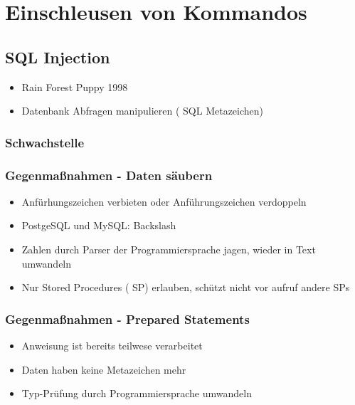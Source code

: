\section*{Einschleusen von Kommandos}
\subsection*{ SQL Injection}
\begin{itemize}
	\item Rain Forest Puppy 1998
	\item Datenbank Abfragen manipulieren ( SQL Metazeichen)
\end{itemize}
\subsubsection*{Schwachstelle }


\subsubsection*{ Gegenmaßnahmen - Daten säubern }
\begin{itemize}
	\item Anfürhungszeichen verbieten oder Anführungszeichen verdoppeln
	\item PostgeSQL und MySQL: Backslash \
	\item Zahlen durch Parser der Programmiersprache jagen, wieder in Text umwandeln
	\item Nur Stored Procedures ( SP) erlauben, schützt nicht vor aufruf andere SPs
\end{itemize}

\subsubsection*{Gegenmaßnahmen - Prepared Statements }
\begin{itemize}
	\item  Anweisung ist bereits teilwese verarbeitet
	\item Daten haben keine Metazeichen mehr
	\item Typ-Prüfung durch Programmiersprache umwandeln
\end{itemize}